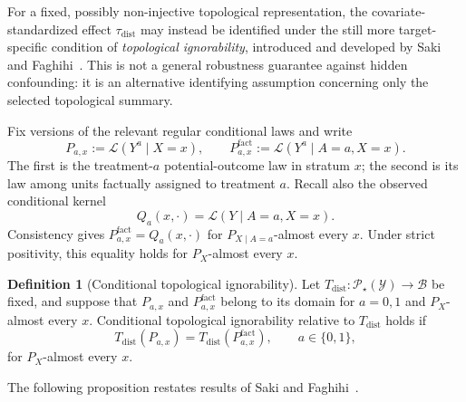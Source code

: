 \documentclass[11pt,a4paper]{article}
\theoremstyle{plain}
\theoremstyle{definition}
\newtheorem{definition}[theorem]{Definition}
\theoremstyle{remark}
\newcommand{\1}{\mathbbm{1}}
\begin{document}
For a fixed, possibly non-injective topological representation, the covariate-standardized effect \(\tau_{\mathrm{dist}}\) may instead be identified under the still more target-specific condition of \emph{topological ignorability}, introduced and developed by Saki and Faghihi~\citep{sakifaghihi2026}. This is not a general robustness guarantee against hidden confounding: it is an alternative identifying assumption concerning only the selected topological summary.

Fix versions of the relevant regular conditional laws and write
\[
P_{a,x}
:=
\mathcal L(Y^a\mid X=x),
\qquad
P^{\mathrm{fact}}_{a,x}
:=
\mathcal L(Y^a\mid A=a,X=x).
\]
The first is the treatment-\(a\) potential-outcome law in stratum \(x\); the second is its law among units factually assigned to treatment \(a\). Recall also the observed conditional kernel
\[
Q_a(x,\cdot)
=
\mathcal L(Y\mid A=a,X=x).
\]
Consistency gives \(P^{\mathrm{fact}}_{a,x} = Q_a(x,\cdot)\) for \(P_{X\mid A=a}\)-almost every \(x\). Under strict positivity, this equality holds for \(P_X\)-almost every \(x\).

\begin{definition}[Conditional topological ignorability]
\label{def:topological-ignorability}
Let
\(T_{\mathrm{dist}}: \mathcal P_\star(\mathcal Y)\to\mathcal B
\) be fixed, and suppose that \(P_{a,x}\) and
\(P^{\mathrm{fact}}_{a,x}\) belong to its domain for
\(a=0,1\) and \(P_X\)-almost every \(x\).
Conditional topological ignorability relative to
\(T_{\mathrm{dist}}\) holds if
\[
T_{\mathrm{dist}}(P_{a,x})
=
T_{\mathrm{dist}}(P^{\mathrm{fact}}_{a,x}),
\qquad
a\in\{0,1\},
\]
for \(P_X\)-almost every \(x\).
\end{definition}

The following proposition restates results of Saki and
Faghihi~\citep{sakifaghihi2026}.
\end{document}
